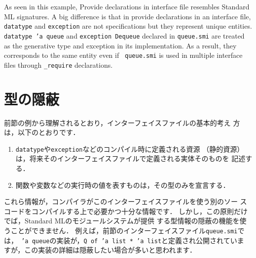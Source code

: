 \documentclass{jbook}
\newif\ifjp
\newcommand{\txt}[2]{#1}
\begin{document}
	As seen in this example, Provide declarations in interface file
resembles Standard ML signatures.
	A big difference is that in provide declarations in an interface
file, {\tt datatype} and {\tt exception} are not specifications but they
represent unique entities.
	{\tt datatype 'a queue} and {\tt exception Dequeue} declared in
{\tt queue.smi} are treated as the generative type and exception in its
implementation.
	As a result, they corresponds to the same entity even if {\tt
queue.smi} is used in multiple interface files through  {\tt \_require}
declarations.

\fi%

\section{\txt{型の隠蔽}{Opaque types}}
\label{sec:tutorialOpaqueTypeInterface}

\ifjp%
	前節の例から理解されるとおり，インターフェイスファイルの基本的考え
方は，以下のとおりです．
\begin{enumerate}
\item {\tt datatype}や{\tt exception}などのコンパイル時に定義される資源
（静的資源）は，将来そのインターフェイスファイルで定義される実体そのものを
記述する．
\item 関数や変数などの実行時の値を表すものは，その型のみを宣言する．
\end{enumerate}
	これら情報が，コンパイラがこのインターフェイスファイルを使う別のソー
スコードをコンパイルする上で必要かつ十分な情報です．
	しかし，この原則だけでば，Standard MLのモジュールシステムが提供
する型情報の隠蔽の機能を使うことができません．
	例えば，前節のインターフェイスファイル{\tt queue.smi}では，{\tt
'a queue}の実装が，{\tt Q of 'a list * 'a list}と定義され公開されていま
すが，この実装の詳細は隠蔽したい場合が多いと思われます．
\end{document}
